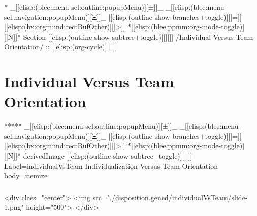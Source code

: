 \begin{whenOrg}
\begin{verblatex}
\begin{frame}[fragile,plain,label=naturalLanguageCompiler]

\end{frame}
\end{verblatex}



\begin{whenOrg}
*  _[[elisp:(blee:menu-sel:outline:popupMenu)][±]]_ _[[elisp:(blee:menu-sel:navigation:popupMenu)][Ξ]]_ [[elisp:(outline-show-branches+toggle)][|=]] [[elisp:(bx:orgm:indirectBufOther)][|>]] *[[elisp:(blee:ppmm:org-mode-toggle)][|N]]*  Section    [[elisp:(outline-show-subtree+toggle)][||]]   /Individual Versus Team Orientation/ ::  [[elisp:(org-cycle)][| ]]
\end{whenOrg}

\section{Individual Versus Team Orientation}

\begin{whenOrg}
*****  _[[elisp:(blee:menu-sel:outline:popupMenu)][±]]_ _[[elisp:(blee:menu-sel:navigation:popupMenu)][Ξ]]_ [[elisp:(outline-show-branches+toggle)][|=]] [[elisp:(bx:orgm:indirectBufOther)][|>]] *[[elisp:(blee:ppmm:org-mode-toggle)][|N]]*  derivedImage [[elisp:(outline-show-subtree+toggle)][||]] Label=individualVsTeam Individualization Versus Team Orientation body=itemize
\end{whenOrg}

\begin{htmlonly}

\begin{frame}[fragile,plain,label=individualVsTeam]
    \frametitle{}
    \framesubtitle{}
    \begin{rawhtml}
<div class="center">
<img src="./disposition.gened/individualVsTeam/slide-1.png" height="500">
</div>
    \end{rawhtml}
\end{frame}
\end{htmlonly}


\end{whenOrg}
